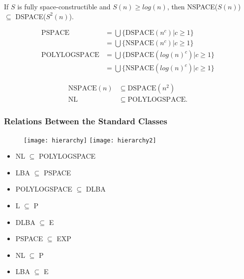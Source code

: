  If $S$ is fully space-constructible and $S(n) \ge
log(n)$, then NSPACE($S(n)$) $\subseteq$ DSPACE($S^2(n)$).

\begin{align*}
  \text{PSPACE} &= \bigcup \{\text{DSPACE}(n^c) | c \ge 1\}\\
  &= \bigcup \{\text{NSPACE}(n^c) | c \ge 1\} \\
  \text{POLYLOGSPACE} &= \bigcup\{\text{DSPACE}(log(n)^c) | c \ge 1\}\\
  &= \bigcup \{\text{NSPACE}(log(n)^c) | c \ge 1\}
\end{align*}

\begin{align*}
\text{NSPACE}(n) &\subseteq \text{DSPACE}(n^2)\\
\text{NL} &\subseteq  \text{POLYLOGSPACE}.
\end{align*}

\subsubsection{Relations Between the Standard Classes}
\begin{figure}[H]
  \centering
  \texttt{[image: hierarchy]}
  \texttt{[image: hierarchy2]}
\end{figure}

\begin{itemize}
  \item NL $\subseteq$ POLYLOGSPACE
  \item LBA $\subseteq$ PSPACE
\end{itemize}

\begin{itemize}
  \item POLYLOGSPACE $\subseteq$ DLBA
\end{itemize}

\begin{itemize}
  \item L $\subseteq$ P
  \item DLBA $\subseteq$ E
  \item PSPACE $\subseteq$ EXP
\end{itemize}

\begin{itemize}
  \item NL $\subseteq$ P 
  \item LBA $\subseteq$ E
\end{itemize}

